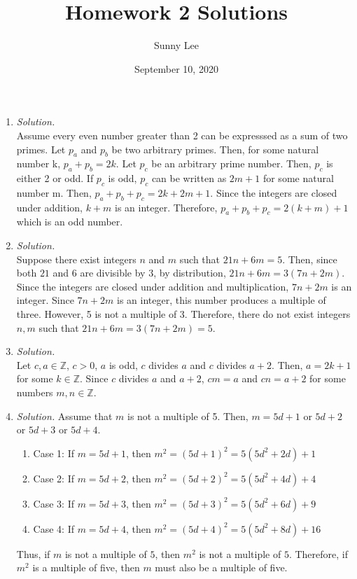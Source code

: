 \documentclass{article}
\title{Homework 2 Solutions}
\author{Sunny Lee}
\date{September 10, 2020}
\newcommand{\zz}{\mathbb Z}
\begin{document}
\begin{enumerate}
    \item \emph{Solution.} \\
    Assume every even number greater than 2 can be expresssed 
    as a sum of two primes. Let $p_{a}$ and $p_{b}$ be two arbitrary primes. Then, for
    some natural number k, $p_{a} + p_{b} = 2k$. Let $p_{c}$ be an arbitrary prime number. 
    Then, $p_{c}$ is either 2 or odd. If $p_{c}$ is odd, $p_{c}$ can be written 
    as $2m+1$ for some natural number m. Then, $p_{a} + p_{b} + p_{c} = 2k + 2m + 1$. 
    Since the integers are closed under addition, $k+m$ is an integer. Therefore, 
    $p_{a} + p_{b} + p_{c} = 2(k+m) + 1$ which is an odd number. 

    \item \emph{Solution.}\\
    Suppose there exist integers $n$ and $m$ such that $21n + 6m = 5$. Then, since both 
    $21$ and $6$ are divisible by $3$, by distribution, $21n + 6m = 3(7n + 2m)$. Since 
    the integers are closed under addition and multiplication, $7n + 2m$ is an integer.
    Since $7n + 2m$ is an integer, this number produces a multiple of three. However, 
    5 is not a multiple of 3. Therefore, there do not exist integers $n, m$  such that
    $21n + 6m = 3(7n + 2m) = 5$. 

    \item \emph{Solution.} \\
    Let $c, a \in \zz$, $c > 0$, $a$ is odd, $c$ divides $a$ and $c$ divides $a+2$. Then, 
    $a = 2k + 1$ for some $k \in \zz$. Since $c$ divides $a$ and $a+2$, $cm = a$
    and $cn = a+2$ for some numbers $m, n \in \zz$. 
    
    \item \emph{Solution.}
    Assume that $m$ is not a multiple of 5. Then, $m = 5d + 1$ or $5d + 2$ or $5d + 3$ or $5d + 4$. 
    \begin{enumerate}
        \item Case 1: If $m = 5d + 1$, then $m^2 = (5d + 1)^2 = 5(5d^2+2d)+1$
        \item Case 2: If $m = 5d + 2$, then $m^2 = (5d + 2)^2 = 5(5d^2+4d)+4$
        \item Case 3: If $m = 5d + 3$, then $m^2 = (5d + 3)^2 = 5(5d^2+6d)+9$
        \item Case 4: If $m = 5d + 4$, then $m^2 = (5d + 4)^2 = 5(5d^2+8d)+16$
    \end{enumerate}
    Thus, if $m$ is not a multiple of $5$, then $m^2$ is not a multiple of $5$. Therefore, 
    if $m^2$ is a multiple of five, then $m$ must also be a multiple of five. 


\end{enumerate}
\end{document}
